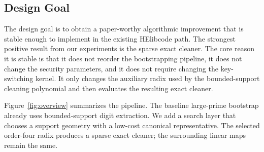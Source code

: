 \documentclass[a4paper,runningheads]{llncs}
\newcommand{\HElib}{\textsf{HElib}}
\begin{document}
\subsection{Design Goal}

The design goal is to obtain a paper-worthy algorithmic improvement that is
stable enough to implement in the existing \HElib code path.  The strongest
positive result from our experiments is the sparse exact cleaner.  The core
reason it is stable is that it does not reorder the bootstrapping pipeline, it
does not change the security parameters, and it does not require changing the
key-switching kernel.  It only changes the auxiliary radix used by the
bounded-support cleaning polynomial and then evaluates the resulting exact
cleaner.

Figure~\ref{fig:overview} summarizes the pipeline.  The baseline large-prime
bootstrap already uses bounded-support digit extraction.  We add a search
layer that chooses a support geometry with a low-cost canonical
representative.  The selected order-four radix produces a sparse exact
cleaner; the surrounding linear maps remain the same.
\end{document}
